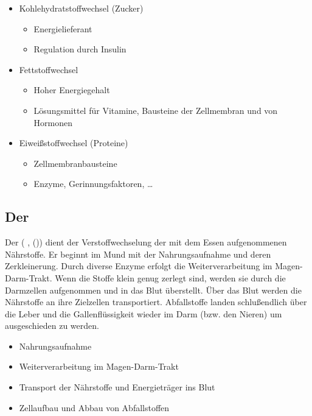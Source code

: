 {}{
\begin{itemize}
  \item Kohlehydratstoffwechsel (Zucker)
  \begin{itemize}
    \item Energielieferant
    \item Regulation durch Insulin
  \end{itemize}
  \item Fettstoffwechsel 
  \begin{itemize}
    \item Hoher Energiegehalt
    \item Lösungsmittel für Vitamine, Bausteine der Zellmembran und von
    Hormonen
  \end{itemize}
  \item Eiweißstoffwechsel (Proteine)
  \begin{itemize}
    \item Zellmembranbausteine
    \item Enzyme, Gerinnungsfaktoren, \ldots
  \end{itemize}
\end{itemize}
}{}{}{}




\cite{AlbertsMolZellbiologie2,LoefflerBiochemie7}



\subsection{Der }

%
%
%
\label{topic:gastrointestinaltrakt}%


\TextSlide{\TxBeschreibung}
{%
Der  
( , 
   
()) 
dient der Verstoffwechselung der mit dem
Essen aufgenommenen Nährstoffe.
Er beginnt im Mund mit der Nahrungsaufnahme und deren
Zerkleinerung. Durch diverse Enzyme erfolgt die
Weiterverarbeitung im Magen-Darm-Trakt. Wenn die Stoffe klein genug
zerlegt sind, werden sie durch die Darmzellen aufgenommen
und in das Blut überstellt. Über das Blut werden die
Nährstoffe an ihre Zielzellen transportiert.
Abfallstoffe landen schlußendlich 
über die Leber und die Gallenflüssigkeit 
wieder im Darm 
(bzw. den Nieren) 
um ausgeschieden zu werden.
}
{
\begin{itemize}
  \item Nahrungsaufnahme
  \item Weiterverarbeitung im Magen-Darm-Trakt
  \item Transport der Nährstoffe und Energieträger ins Blut
  \item Zellaufbau und Abbau von Abfallstoffen
\end{itemize}
}{}{}{}



